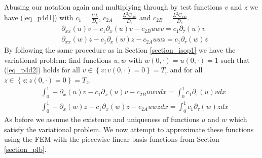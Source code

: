 \documentclass[11pt,fleqn]{article}
\theoremstyle{defstyle}
\begin{document}
Abusing our notation again and multiplying through by test functions $v$ and $z$ we have (\ref{eq_p4d1}) with $c_1 = \frac{UL}{D_e}$,  $c_{2A} = \frac{L^2C_{A0}}{D_e}$ and  $c_{2B} = \frac{L^2C_{B0}}{D_e}$.
\begin{equation}
\begin{aligned}
&\partial_{xx}(u)v - c_1\partial_x(u)v - c_{2B}uwv = c_1\partial_\tau(u)v \\
&\partial_{xx}(w)z - c_1\partial_x(w)z - c_{2A}uwz = c_1\partial_\tau(w)z 
\end{aligned}
\label{eq_p4d1}
\end{equation}
By following the same procedure as in Section \ref{section_isop1} we have the variational problem: find functions $u, w$ with $w(0,\cdot)=u(0,\cdot)=1$ such that (\ref{eq_p4d2}) holds for all $v \in \left\{v : v(0,\cdot) = 0 \right\} = T_v$ and for all $z \in \left\{z : z(0,\cdot) = 0 \right\} = T_z$.
\begin{equation}
\begin{aligned}
&\int_0^1 -\partial_{x}(u)v - c_1\partial_x(u)v - c_{2B}uwvdx = \int_0^1 c_1\partial_\tau(u)v dx \\
&\int_0^1-\partial_{x}(w)z - c_1\partial_x(w)z - c_{2A}uwzdx = \int_0^1 c_1\partial_\tau(w)zdx 
\end{aligned}
\label{eq_p4d2}
\end{equation}
As before we assume the existence and uniqueness of functions $u$ and $w$ which satisfy the variational problem. We now attempt to approximate these functions using the FEM with the piecewise linear basis functions from Section \ref{section_plb}. 
\end{document}

